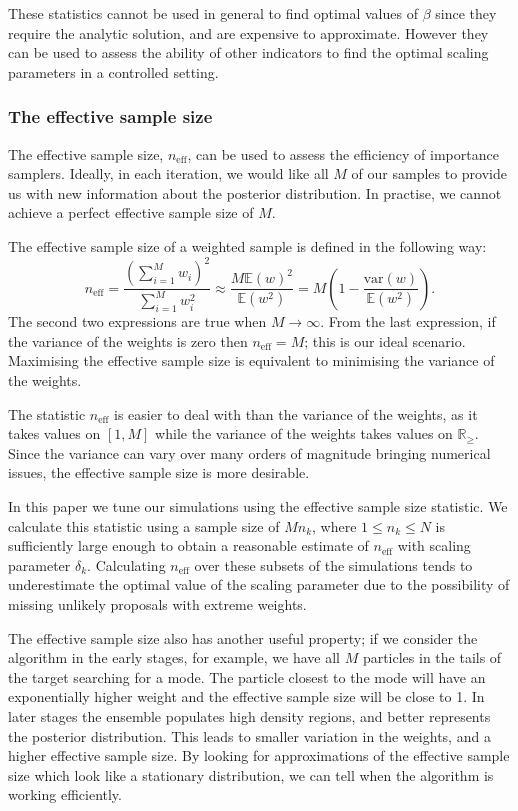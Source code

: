 \documentclass[final]{siamltex}
\newcommand{\neff}{n_{\text{eff}}}
\newcommand{\E}{{\mathbb E}}
\begin{document}
These statistics cannot be used in general to find optimal values of
$\beta$ since they require the analytic solution, and are expensive to
approximate. However they can be used to assess the ability of other
indicators to find the optimal scaling parameters in a controlled
setting.


\subsubsection{The effective sample size}\label{sec:ess}

The effective sample size, $\neff$, can be used to assess the
efficiency of importance samplers. Ideally, in each iteration, we
would like all $M$ of our samples to provide us with new information
about the posterior distribution. In practise, we cannot achieve a
perfect effective sample size of $M$.

The effective sample size of a weighted sample is defined in the
following way:
\[
	\neff = \frac{\left(\sum_{i=1}^M \! w_i\right)^2}{\sum_{i=1}^M \! w_i^2} \approx \frac{M\E(w)^2}{\E(w^2)} = M\left(1 - \frac{\mbox{var}(w)}{\mathbb{E}(w^2)}\right).
\]
The second two expressions are true when $M\rightarrow\infty$. From
the last expression, if the variance of the weights is zero then
$\neff = M$; this is our ideal scenario. Maximising the effective
sample size is equivalent to minimising the variance of the weights.

The statistic $\neff$ is easier to deal with than the variance of the
weights, as it takes values on $[1, M]$ while the variance of the
weights takes values on $\mathbb{R}_\geq$. Since the variance can vary
over many orders of magnitude bringing numerical issues, the effective
sample size is more desirable.

In this paper we tune our simulations using the effective sample size
statistic. We calculate this statistic using a sample size of $Mn_k$,
where $1 \leq n_k\leq N$ is sufficiently large enough to obtain a
reasonable estimate of $\neff$ with scaling parameter $\delta_k$.
Calculating $\neff$ over these subsets of the simulations tends to
underestimate the optimal value of the scaling parameter due to the
possibility of missing unlikely proposals with extreme weights.

The effective sample size also has another useful property; if we
consider the algorithm in the early stages, for example, we have all
$M$ particles in the tails of the target searching for a mode. The
particle closest to the mode will have an exponentially higher weight
and the effective sample size will be close to 1. In later stages the
ensemble populates high density regions, and better represents the
posterior distribution. This leads to smaller variation in the
weights, and a higher effective sample size. By looking for
approximations of the effective sample size which look like a
stationary distribution, we can tell when the algorithm is working
efficiently.
\end{document}
